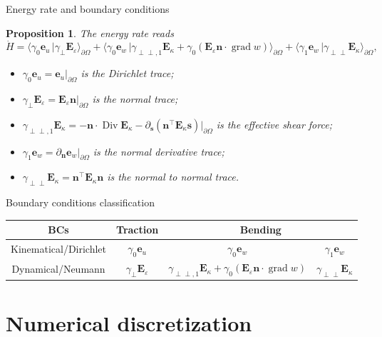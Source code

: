 \documentclass[aspectratio=169]{beamer}
\DeclareMathOperator*{\grad}{grad}
\DeclareMathOperator*{\Div}{Div}
\newcommand{\dualpr}[3][]{\ensuremath{\langle #2 \, \vert #3 \rangle_{#1}}}
\newtheorem{proposition}{Proposition}
\begin{document}
\begin{frame}{Energy rate and boundary conditions}
	
	\begin{proposition}{The energy rate reads}
	\begin{equation*}
		\dot{H} = \dualpr[\partial\Omega]{\gamma_0\bm{e}_u}{\gamma_\perp \bm{E}_\varepsilon} + \dualpr[\partial\Omega]{\gamma_0\bm{e}_w}{\gamma_{\perp\perp, 1} \bm{E}_\kappa + \gamma_0(\bm{E}_\varepsilon \bm{n} \cdot \grad w)} + \dualpr[\partial\Omega]{\gamma_1\bm{e}_w}{\gamma_{\perp\perp} \bm{E}_\kappa},
	\end{equation*}
\begin{itemize}
	\item $\gamma_0\bm{e}_u= \bm{e}_u\vert_{\partial\Omega}$ is the Dirichlet trace;
	\item $\gamma_\perp \bm{E}_\varepsilon = \bm{E}_\varepsilon \bm{n}\vert_{\partial\Omega}$ is the normal trace;
	\item $\gamma_{\perp\perp, 1} \bm{E}_\kappa = - \bm{n} \cdot \Div \bm{E}_\kappa - \partial_{\bm{s}}(\bm{n}^\top \bm{E}_\kappa \bm{s})\vert_{\partial\Omega}$ is the effective shear force;
	\item $\gamma_1 \bm{e}_w = \partial_{\bm{n}} \bm{e}_w\vert_{\partial\Omega}$ is the normal derivative trace;
	\item $\gamma_{\perp\perp} \bm{E}_\kappa = \bm{n}^\top \bm{E}_\kappa \bm{n}$ is the normal to normal trace.
\end{itemize}
	\end{proposition}

\begin{table}[h]
	Boundary conditions classification
	\centering
	\begin{tabular}{c|c|c|c}
		\hline 
		BCs & Traction & \multicolumn{2}{c}{Bending} \\ 
		\hline 
		Kinematical/Dirichlet & $\gamma_0 \bm{e}_u$ & $\gamma_0\bm{e}_w$  & $\gamma_1 \bm{e}_w $  \\
		Dynamical/Neumann & $\gamma_\perp \bm{E}_\varepsilon$ & $\gamma_{\perp\perp, 1} \bm{E}_\kappa + \gamma_0(\bm{E}_\varepsilon \bm{n} \cdot \grad w)$ & $\gamma_{\perp\perp} \bm{E}_\kappa$ \\ 
		\hline 
	\end{tabular} 
\end{table}

\end{frame}


\section{Numerical discretization}
\end{document}
